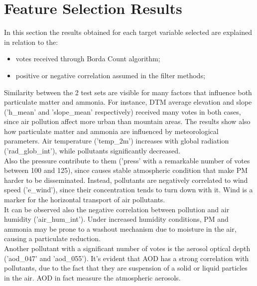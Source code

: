 \section{Feature Selection Results}
In this section the results obtained for each target variable selected are explained in relation to the:
\begin{itemize}
    \item votes received through Borda Count algorithm;
    \item positive or negative correlation assumed in the filter methods;
\end{itemize}
Similarity between the 2 test sets are visible for many factors that influence both particulate matter and ammonia.
For instance, DTM average elevation and slope ('h\_mean' and 'slope\_mean' respectively) received many votes in both cases, since air pollution affect more urban than mountain areas.
The results show also how particulate matter and ammonia are influenced by meteorological parameters.
Air temperature ('temp\_2m') increases with global radiation ('rad\_glob\_int'), while pollutants significantly decreased\cite{li2015particulate}. \\
Also the pressure contribute to them ('press' with a remarkable number of votes between 100 and 125), since causes stable atmospheric condition that make PM harder to be disseminated. 
Instead, pollutants are negatively correlated to wind speed ('e\_wind'), since their concentration tends to turn down with it. Wind is a marker for the horizontal transport of air pollutants.\\
It can be observed also the negative correlation between pollution and air humidity ('air\_hum\_int').
Under increased humidity conditions, PM and ammonia may be prone to a washout mechanism due to moisture in the air, causing a particulate reduction\cite{biglari2017relationship}.\\
Another pollutant with a significant number of votes is the aerosol optical depth ('aod\_047' and 'aod\_055'). It's evident that AOD has a strong correlation with pollutants, due to the fact that they are suspension of a solid or liquid particles in the air. AOD in fact measure the atmospheric aerosols.
